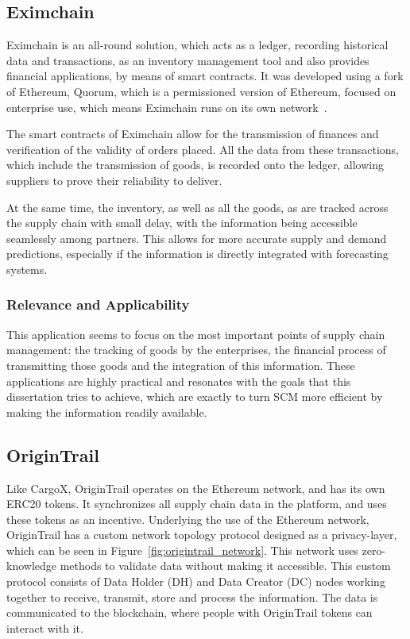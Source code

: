 \subsection{Eximchain}
Eximchain is an all-round solution, which acts as a ledger, recording historical data and transactions, as an inventory management tool and also provides financial applications, by means of smart contracts. It was developed using a fork of Ethereum, Quorum, which is a permissioned version of Ethereum, focused on enterprise use, which means Eximchain runs on its own network~\cite{Huertas2017}.


The smart contracts of Eximchain allow for the transmission of finances and verification of the validity of orders placed. All the data from these transactions, which include the transmission of goods, is recorded onto the ledger, allowing suppliers to prove their reliability to deliver. 


At the same time, the inventory, as well as all the goods, as are tracked across the supply chain with small delay, with the information being accessible seamlessly among partners. This allows for more accurate supply and demand predictions, especially if the information is directly integrated with forecasting systems.

\subsubsection{Relevance and Applicability}
This application seems to focus on the most important points of supply chain management: the tracking of goods by the enterprises, the financial process of transmitting those goods and the integration of this information. These applications are highly practical and resonates with the goals that this dissertation tries to achieve, which are exactly to turn SCM more efficient by making the information readily available.

\subsection{OriginTrail}
Like CargoX, OriginTrail operates on the Ethereum network, and has its own ERC20 tokens. It synchronizes all supply chain data in the platform, and uses these tokens as an incentive. Underlying the use of the Ethereum network, OriginTrail has a custom network topology protocol designed as a privacy-layer, which can be seen in Figure~\ref{fig:origintrail_network}. This network uses zero-knowledge methods to validate data without making it accessible. This custom protocol consists of Data Holder (DH) and Data Creator (DC) nodes working together to receive, transmit, store and process the information. The data is communicated to the blockchain, where people with OriginTrail tokens can interact with it.

